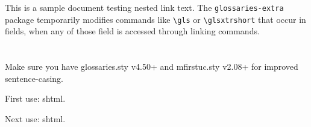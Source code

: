 \documentclass{article}
\begin{document}
This is a sample document testing nested link text.
The \texttt{glossaries-extra} package temporarily modifies
commands like \verb|\gls| or \verb|\glsxtrshort| that occur
in fields, when any of those field is accessed through linking
commands.

\section{}

Make sure you have glossaries.sty v4.50+ and mfirstuc.sty v2.08+ for
improved sentence-casing.

First use: \gls{shtml}.

\newpage

Next use: \gls{shtml}.

\newpage

\printglossaries
\end{document}
